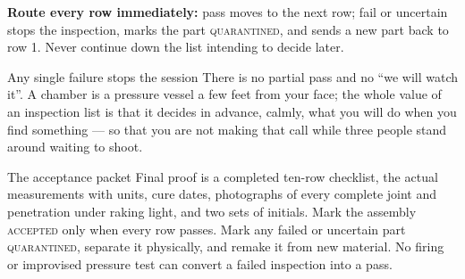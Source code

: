 \noindent\textbf{Route every row immediately:} pass moves to the next row;
fail or uncertain stops the inspection, marks the part \textsc{quarantined},
and sends a new part back to row 1. Never continue down the list intending to
decide later.

\begin{gate}{Any single failure stops the session}
There is no partial pass and no ``we will watch it''. A chamber is a pressure
vessel a few feet from your face; the whole value of an inspection list is that
it decides in advance, calmly, what you will do when you find something --- so
that you are not making that call while three people stand around waiting to
shoot.
\end{gate}

\begin{telospanel}{The acceptance packet}
Final proof is a completed ten-row checklist, the actual measurements with
units, cure dates, photographs of every complete joint and penetration under
raking light, and two sets of initials. Mark the assembly \textsc{accepted}
only when every row passes. Mark any failed or uncertain part
\textsc{quarantined}, separate it physically, and remake it from new material.
No firing or improvised pressure test can convert a failed inspection into a
pass.
\end{telospanel}



